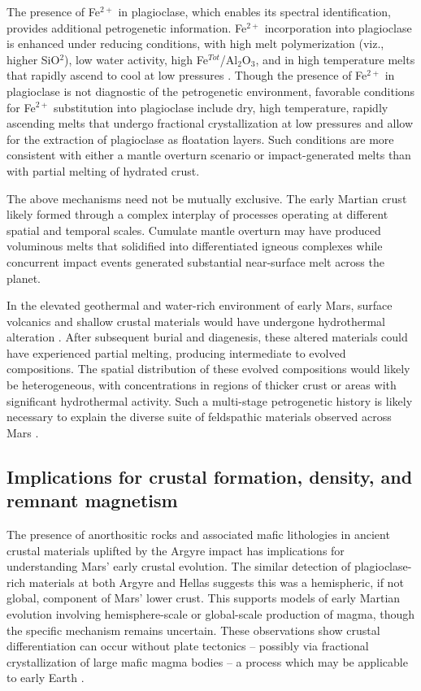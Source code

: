 \documentclass[12pt]{article}
\begin{document}
The presence of Fe$^{2+}$ in plagioclase, which enables its spectral identification, provides additional petrogenetic information. Fe$^{2+}$ incorporation into plagioclase is enhanced under reducing conditions, with high melt polymerization (viz., higher SiO$^2$), low water activity, high Fe$^{Tot}$/Al$_{2}$O$_{3}$, and in high temperature melts that rapidly ascend to cool at low pressures \citep{Wenk1973, Longhi1976, Smith1988, Phinney1992, Ashwal1993, Lundgaard2004}. Though the presence of Fe$^{2+}$ in plagioclase is not diagnostic of the petrogenetic environment, favorable conditions for Fe$^{2+}$ substitution into plagioclase include dry, high temperature, rapidly ascending melts that undergo fractional crystallization at low pressures and allow for the extraction of plagioclase as floatation layers. Such conditions are more consistent with either a mantle overturn scenario or impact-generated melts than with partial melting of hydrated crust.

The above mechanisms need not be mutually exclusive. The early Martian crust likely formed through a complex interplay of processes operating at different spatial and temporal scales. Cumulate mantle overturn may have produced voluminous melts that solidified into differentiated igneous complexes while concurrent impact events generated substantial near-surface melt across the planet.

In the elevated geothermal and water-rich environment of early Mars, surface volcanics and shallow crustal materials would have undergone hydrothermal alteration \citep{Viviano2019}. After subsequent burial and diagenesis, these altered materials could have experienced partial melting, producing intermediate to evolved compositions. The spatial distribution of these evolved compositions would likely be heterogeneous, with concentrations in regions of thicker crust or areas with significant hydrothermal activity. Such a multi-stage petrogenetic history is likely necessary to explain the diverse suite of feldspathic materials observed across Mars \citep{Carter2013, Wray2013, Rogers2015, Viviano-Beck2017, Farrand2021, Payre2022, Payre2024, Phillips2022, Flahaut2023, Michalski2023}.

\subsection*{Implications for crustal formation, density, and remnant magnetism}

The presence of anorthositic rocks and associated mafic lithologies in ancient crustal materials uplifted by the Argyre impact has implications for understanding Mars' early crustal evolution. The similar detection of plagioclase-rich materials at both Argyre and Hellas \citep{Phillips2022} suggests this was a hemispheric, if not global, component of Mars' lower crust. This supports models of early Martian evolution involving hemisphere-scale or global-scale production of magma, though the specific mechanism remains uncertain. These observations show crustal differentiation can occur without plate tectonics -- possibly via fractional crystallization of large mafic magma bodies -- a process which may be applicable to early Earth \citep{Kranendonk2010}.
\end{document}
